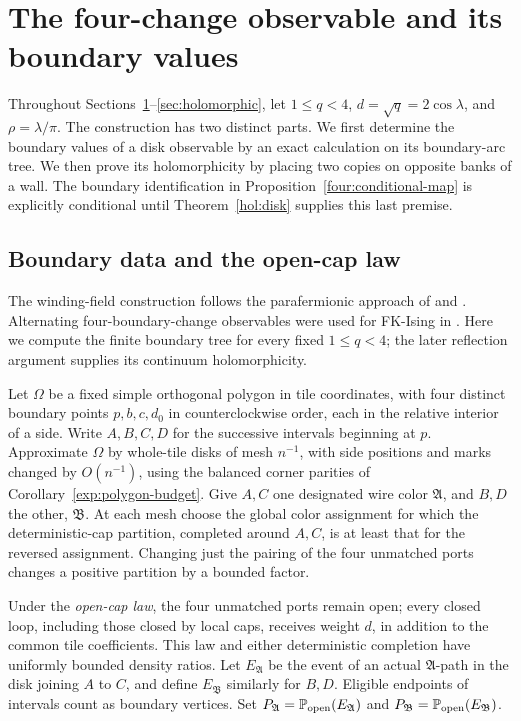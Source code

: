 \section{The four-change observable and its boundary values}
\label{sec:fourchange}

Throughout Sections~\ref{sec:fourchange}--\ref{sec:holomorphic}, let
$1\le q<4$, $d=\sqrt q=2\cos\lambda$, and $\rho=\lambda/\pi$.
The construction has two distinct parts.  We first determine the boundary
values of a disk observable by an exact calculation on its boundary-arc
tree.  We then prove its holomorphicity by placing two copies on opposite
banks of a wall.  The boundary identification in
Proposition~\ref{four:conditional-map} is explicitly conditional until
Theorem~\ref{hol:disk} supplies this last premise.

\subsection{Boundary data and the open-cap law}

The winding-field construction follows the parafermionic approach of
\citet{Smirnov2010} and \citet{RivaCardy2006}.  Alternating four-boundary-change
observables were used for FK-Ising in \citet[Section~6]{ChelkakSmirnov2012}.
Here we compute the finite boundary tree for every fixed $1\le q<4$;
the later reflection argument supplies its continuum holomorphicity.

Let $\Omega$ be a fixed simple orthogonal polygon in tile coordinates,
with four distinct boundary points $p,b,c,d_0$ in counterclockwise order,
each in the relative interior of a side.  Write $A,B,C,D$ for the successive
intervals beginning at $p$.  Approximate $\Omega$ by whole-tile disks of
mesh $n^{-1}$, with side positions and marks changed by $O(n^{-1})$,
using the balanced corner parities of Corollary~\ref{exp:polygon-budget}.
Give $A,C$ one designated wire color $\mathfrak A$, and $B,D$ the other,
$\mathfrak B$.  At each mesh choose the global color assignment for which
the deterministic-cap partition, completed around $A,C$, is at least
that for the reversed assignment.  Changing just the pairing of the four
unmatched ports changes a positive partition by a bounded factor.

Under the \emph{open-cap law}, the four unmatched ports remain open;
every closed loop, including those closed by local caps, receives weight
$d$, in addition to the common tile coefficients.  This law and either
deterministic completion have uniformly bounded density ratios.  Let
$E_{\mathfrak A}$ be the event of an actual $\mathfrak A$-path in the disk
joining $A$ to $C$, and define $E_{\mathfrak B}$ similarly for $B,D$.
Eligible endpoints of intervals count as boundary vertices.  Set
$P_{\mathfrak A}=\mathbb P_{\rm open}(E_{\mathfrak A})$ and
$P_{\mathfrak B}=\mathbb P_{\rm open}(E_{\mathfrak B})$.

